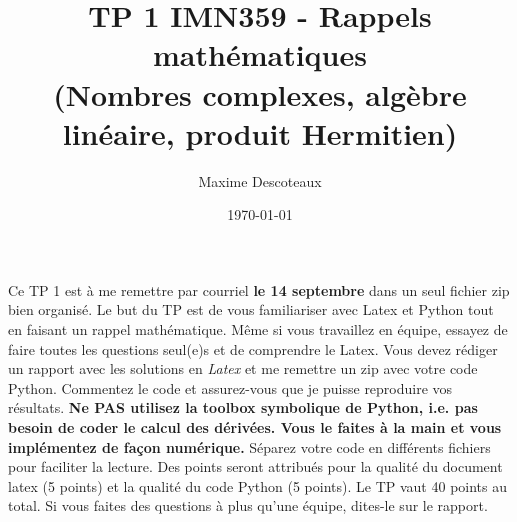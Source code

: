 \documentclass{article}
\title{TP 1 IMN359 - Rappels mathématiques \\
(Nombres complexes, algèbre linéaire, produit Hermitien)}
\author{Maxime Descoteaux}
\date{\today}
\begin{document}
\maketitle

Ce TP 1 est à me remettre par courriel {\bf le 14 septembre} 
dans un seul fichier zip bien organisé. Le but du TP est de vous
familiariser avec Latex et Python tout en faisant un rappel
mathématique. Même si vous travaillez en équipe, essayez de faire
toutes les questions seul(e)s et de comprendre le Latex. 
Vous devez rédiger un rapport avec les solutions en 
\emph{Latex} et me remettre un zip avec votre code Python. Commentez
le code et assurez-vous que je puisse reproduire vos 
résultats. {\bf Ne PAS utilisez la toolbox symbolique de Python,
  i.e. pas besoin de coder le calcul des dérivées. Vous le faites à la
main et vous implémentez de façon numérique.}
Séparez votre code en différents fichiers pour faciliter la
lecture. Des points seront attribués pour la qualité du document latex
(5 points) et la qualité du code Python (5 points). Le TP vaut 40
points au total. Si vous faites des questions à plus qu'une équipe,
dites-le sur le rapport. 
\end{document}

